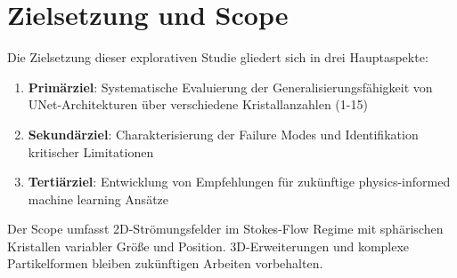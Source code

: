 \section{Zielsetzung und Scope}

Die Zielsetzung dieser explorativen Studie gliedert sich in drei Hauptaspekte:

\begin{enumerate}
	\item \textbf{Primärziel}: Systematische Evaluierung der Generalisierungsfähigkeit von UNet-Architekturen über verschiedene Kristallanzahlen (1-15)
	\item \textbf{Sekundärziel}: Charakterisierung der Failure Modes und Identifikation kritischer Limitationen
	\item \textbf{Tertiärziel}: Entwicklung von Empfehlungen für zukünftige physics-informed machine learning Ansätze
\end{enumerate}

Der Scope umfasst 2D-Strömungsfelder im Stokes-Flow Regime mit sphärischen Kristallen variabler Größe und Position. 3D-Erweiterungen und komplexe Partikelformen bleiben zukünftigen Arbeiten vorbehalten.
